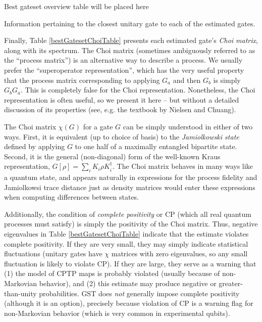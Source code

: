 \documentclass{article}[11pt]
\newcommand{\putfield}[2]{#2}
\begin{document}
\begin{table}[h]
\begin{center}
\putfield{bestGatesetClosestUnitaryTable}{Best gateset overview table will be placed here}
\caption{Information pertaining to the closest unitary gate to each of the estimated gates.\label{bestGatesetClosestUnitaryTable}}
\end{center}
\end{table}


Finally, Table \ref{bestGatesetChoiTable} presents each estimated gate's \emph{Choi matrix}, along with its spectrum.  The Choi matrix (sometimes ambiguously referred to as the ``process matrix'') is an alternative way to describe a process.  We usually prefer the ``superoperator representation'', which has the very useful property that the process matrix corresponding to applying $G_a$ and then $G_b$ is simply $G_bG_a$.  This is completely false for the Choi representation.  Nonetheless, the Choi representation is often useful, so we present it here -- but without a detailed discussion of its properties (see, e.g. the textbook by Nielsen and Chuang).

The Choi matrix $\chi(G)$ for a gate $G$ can be simply understood in either of two ways.  First, it is equivalent (up to choice of basis) to the \emph{Jamiolkowski state} defined by applying $G$ to one half of a maximally entangled bipartite state.  Second, it is the general (non-diagonal) form of the well-known Kraus representation, $G[\rho] = \sum_i{K_i\rho K_i^\dagger}$.  The Choi matrix behaves in many ways like a quantum state, and appears naturally in expressions for the process fidelity and Jamiolkowsi trace distance just as density matrices would enter these expressions when computing differences between states.  

Additionally, the condition of \emph{complete positivity} or CP (which all real quantum processes must satisfy) is simply the positivity of the Choi matrix.  Thus, negative eigenvalues in Table \ref{bestGatesetChoiTable} indicate that the estimate violates complete positivity.  If they are very small, they may simply indicate statistical fluctuations (unitary gates have $\chi$ matrices with zero eigenvalues, so any small fluctuation is likely to violate CP).  If they are large, they serve as a warning that (1) the model of CPTP maps is probably violated (usually because of non-Markovian behavior), and (2) this estimate may produce negative or greater-than-unity probabilities.  GST does \emph{not} generally impose complete positivity (although it is an option), precisely because violation of CP is a warning flag for non-Markovian behavior (which is very common in experimental qubits).
\end{document}
